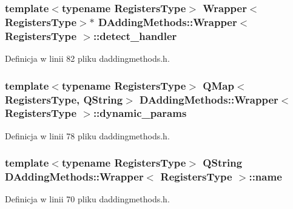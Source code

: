 \hypertarget{class_d_adding_methods_1_1_wrapper_aaa3fdb9659e74c099359cc0af48e4233}{
\subsubsection[{detect\-\_\-handler}]{\setlength{\rightskip}{0pt plus 5cm}template$<$typename Registers\-Type$>$ {\bf Wrapper}$<$Registers\-Type$>$$\ast$ {\bf D\-Adding\-Methods\-::\-Wrapper}$<$ Registers\-Type $>$\-::detect\-\_\-handler}}\label{class_d_adding_methods_1_1_wrapper_aaa3fdb9659e74c099359cc0af48e4233}


Definicja w linii 82 pliku daddingmethods.\-h.

\hypertarget{class_d_adding_methods_1_1_wrapper_ac11ddb3500c96e6175c4b939cc726d4d}{
\subsubsection[{dynamic\-\_\-params}]{\setlength{\rightskip}{0pt plus 5cm}template$<$typename Registers\-Type$>$ Q\-Map$<$Registers\-Type, Q\-String$>$ {\bf D\-Adding\-Methods\-::\-Wrapper}$<$ Registers\-Type $>$\-::dynamic\-\_\-params}}\label{class_d_adding_methods_1_1_wrapper_ac11ddb3500c96e6175c4b939cc726d4d}


Definicja w linii 78 pliku daddingmethods.\-h.

\hypertarget{class_d_adding_methods_1_1_wrapper_a41c5e8fdd7bde2f8610d2d499ae8f4b3}{
\subsubsection[{name}]{\setlength{\rightskip}{0pt plus 5cm}template$<$typename Registers\-Type$>$ Q\-String {\bf D\-Adding\-Methods\-::\-Wrapper}$<$ Registers\-Type $>$\-::name}}\label{class_d_adding_methods_1_1_wrapper_a41c5e8fdd7bde2f8610d2d499ae8f4b3}


Definicja w linii 70 pliku daddingmethods.\-h.

